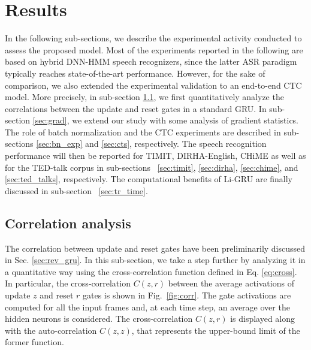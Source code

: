 \documentclass[journal]{IEEEtran}
\begin{document}
\section{Results} \label{sec:res}
In the following sub-sections, we describe the experimental activity conducted to assess the proposed model. Most of the experiments reported in the following are based on hybrid DNN-HMM speech recognizers, since the latter ASR paradigm typically reaches state-of-the-art performance. However, for the sake of comparison, we also extended the experimental validation to an end-to-end CTC model.
More precisely, in sub-section \ref{sec:corr}, we first  quantitatively analyze the correlations between the update and reset gates in a standard GRU. In sub-section \ref{sec:grad}, we extend our study with some analysis of gradient statistics. The role of batch normalization and the CTC experiments are described in sub-sections \ref{sec:bn_exp} and \ref{sec:cts}, respectively. The speech recognition performance will then be reported for TIMIT,  DIRHA-English, CHiME as well as for the TED-talk corpus in  sub-sections ~\ref{sec:timit}, \ref{sec:dirha}, \ref{sec:chime}, and \ref{sec:ted_talks}, respectively. The computational benefits of Li-GRU are finally discussed in sub-section ~\ref{sec:tr_time}. 

\subsection{Correlation analysis} \label{sec:corr}
The correlation between update and reset gates have been preliminarily discussed in Sec. \ref{sec:rev_gru}. In this sub-section, we take a step further by analyzing it in a quantitative way using the cross-correlation function defined in Eq. \ref{eq:cross}.
In particular, the cross-correlation $C(z,r)$ between the average activations of update $z$ and reset $r$ gates is shown in Fig.~\ref{fig:corr}.
The gate activations are computed for all the input frames and, at each time step, an average over the hidden neurons is considered.
The cross-correlation $C(z,r)$ is displayed along with the auto-correlation $C(z,z)$, that represents the upper-bound limit of the former function.  
\end{document}

